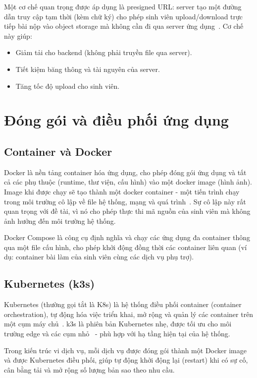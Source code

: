 \documentclass[../BTL.tex]{subfiles}
\begin{document}
Một cơ chế quan trọng được áp dụng là presigned URL: server tạo một đường dẫn truy cập tạm thời (kèm chữ ký) cho phép sinh viên upload/download trực tiếp bài nộp vào object storage mà không cần đi qua server ứng dụng~\cite{awss3docs}. Cơ chế này giúp:
\begin{itemize}
    \item Giảm tải cho backend (không phải truyền file qua server).
    \item Tiết kiệm băng thông và tài nguyên của server.
    \item Tăng tốc độ upload cho sinh viên.
\end{itemize}

\section{Đóng gói và điều phối ứng dụng}
\label{section:1.7}

\subsection{Container và Docker}
\label{section:1.7.1}

Docker là nền tảng container hóa ứng dụng, cho phép đóng gói ứng dụng và tất cả các phụ thuộc (runtime, thư viện, cấu hình) vào một docker image (hình ảnh). Image khi được chạy sẽ tạo thành một docker container - một tiến trình chạy trong môi trường cô lập về file hệ thống, mạng và quá trình~\cite{dockerdocs}. Sự cô lập này rất quan trọng với đề tài, vì nó cho phép thực thi mã nguồn của sinh viên mà không ảnh hưởng đến môi trường hệ thống.

Docker Compose là công cụ định nghĩa và chạy các ứng dụng đa container thông qua một file cấu hình, cho phép khởi động đồng thời các container liên quan (ví dụ: container bài làm của sinh viên cùng các dịch vụ phụ trợ).

\subsection{Kubernetes (k3s)}
\label{section:1.7.2}

Kubernetes (thường gọi tắt là K8s) là hệ thống điều phối container (container orchestration), tự động hóa việc triển khai, mở rộng và quản lý các container trên một cụm máy chủ~\cite{kubernetesdocs}. k3s là phiên bản Kubernetes nhẹ, được tối ưu cho môi trường edge và các cụm nhỏ~\cite{k3sdocs} - phù hợp với hạ tầng hiện tại của hệ thống.

Trong kiến trúc vi dịch vụ, mỗi dịch vụ được đóng gói thành một Docker image và được Kubernetes điều phối, giúp tự động khởi động lại (restart) khi có sự cố, cân bằng tải và mở rộng số lượng bản sao theo nhu cầu.
\end{document}
